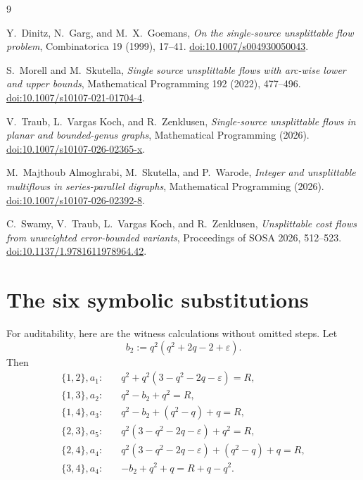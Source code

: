 \documentclass[11pt]{article}
\theoremstyle{remark}
\begin{document}
\begin{thebibliography}{9}

Y.~Dinitz, N.~Garg, and M.~X.~Goemans,
\emph{On the single-source unsplittable flow problem},
Combinatorica 19 (1999), 17--41.
\href{https://doi.org/10.1007/s004930050043}{doi:10.1007/s004930050043}.

S.~Morell and M.~Skutella,
\emph{Single source unsplittable flows with arc-wise lower and upper bounds},
Mathematical Programming 192 (2022), 477--496.
\href{https://doi.org/10.1007/s10107-021-01704-4}{doi:10.1007/s10107-021-01704-4}.

V.~Traub, L.~Vargas Koch, and R.~Zenklusen,
\emph{Single-source unsplittable flows in planar and bounded-genus graphs},
Mathematical Programming (2026).
\href{https://doi.org/10.1007/s10107-026-02365-x}{doi:10.1007/s10107-026-02365-x}.

M.~Majthoub Almoghrabi, M.~Skutella, and P.~Warode,
\emph{Integer and unsplittable multiflows in series-parallel digraphs},
Mathematical Programming (2026).
\href{https://doi.org/10.1007/s10107-026-02392-8}{doi:10.1007/s10107-026-02392-8}.

C.~Swamy, V.~Traub, L.~Vargas Koch, and R.~Zenklusen,
\emph{Unsplittable cost flows from unweighted error-bounded variants},
Proceedings of SOSA 2026, 512--523.
\href{https://doi.org/10.1137/1.9781611978964.42}{doi:10.1137/1.9781611978964.42}.

\end{thebibliography}

\appendix
\section{The six symbolic substitutions}

For auditability, here are the witness calculations without omitted steps.
Let
\[
 b_2:=q^2(q^2+2q-2+\varepsilon).
\]
Then
\begin{align*}
\{1,2\},a_1:\quad
 &q^2+q^2(3-q^2-2q-\varepsilon)=R,\\
\{1,3\},a_2:\quad
 &q^2-b_2+q^2=R,\\
\{1,4\},a_3:\quad
 &q^2-b_2+(q^2-q)+q=R,\\
\{2,3\},a_5:\quad
 &q^2(3-q^2-2q-\varepsilon)+q^2=R,\\
\{2,4\},a_4:\quad
 &q^2(3-q^2-2q-\varepsilon)+(q^2-q)+q=R,\\
\{3,4\},a_4:\quad
 &-b_2+q^2+q=R+q-q^2.
\end{align*}
\end{document}
